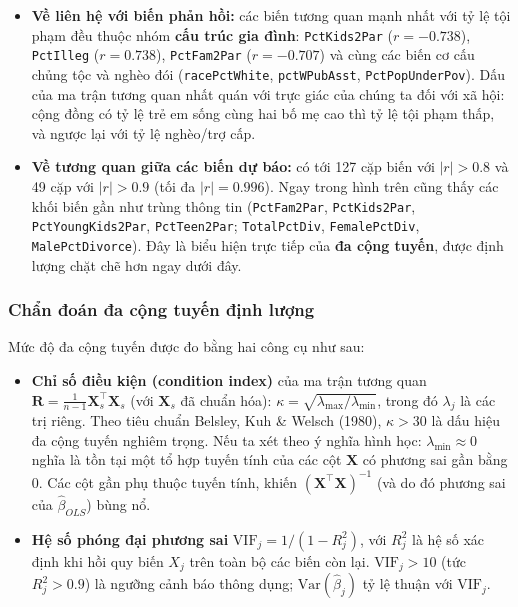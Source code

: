 \begin{itemize}
\tightlist
\item
  \textbf{Về liên hệ với biến phản hồi:} các biến tương quan mạnh nhất
  với tỷ lệ tội phạm đều thuộc nhóm \textbf{cấu trúc gia đình}:
  \texttt{PctKids2Par} (\(r = -0.738\)), \texttt{PctIlleg}
  (\(r = 0.738\)), \texttt{PctFam2Par} (\(r = -0.707\)) và cùng các biến
  cơ cấu chủng tộc và nghèo đói (\texttt{racePctWhite},
  \texttt{pctWPubAsst}, \texttt{PctPopUnderPov}). Dấu của ma trận tương
  quan nhất quán với trực giác của chúng ta đối với xã hội: cộng đồng có
  tỷ lệ trẻ em sống cùng hai bố mẹ cao thì tỷ lệ tội phạm thấp, và ngược
  lại với tỷ lệ nghèo/trợ cấp.
\item
  \textbf{Về tương quan giữa các biến dự báo:} có tới 127 cặp biến với
  \(|r| > 0.8\) và 49 cặp với \(|r| > 0.9\) (tối đa \(|r| = 0.996\)).
  Ngay trong hình trên cũng thấy các khối biến gần như trùng thông tin
  (\texttt{PctFam2Par}, \texttt{PctKids2Par}, \texttt{PctYoungKids2Par},
  \texttt{PctTeen2Par}; \texttt{TotalPctDiv}, \texttt{FemalePctDiv},
  \texttt{MalePctDivorce}).
  Đây là biểu hiện trực tiếp của \textbf{đa cộng tuyến}, được định lượng
  chặt chẽ hơn ngay dưới đây.
\end{itemize}

\subsubsection{Chẩn đoán đa cộng tuyến định
lượng}\label{chux1ea9n-ux111ouxe1n-ux111a-cux1ed9ng-tuyux1ebfn-ux111ux1ecbnh-lux1b0ux1ee3ng}

Mức độ đa cộng tuyến được đo bằng hai công cụ như sau:

\begin{itemize}
\tightlist
\item
  \textbf{Chỉ số điều kiện (condition index)} của ma trận tương quan
  \(\mathbf{R} = \frac{1}{n-1}\mathbf{X}_s^\top \mathbf{X}_s\) (với
  \(\mathbf{X}_s\) đã chuẩn hóa):
  \(\kappa = \sqrt{\lambda_{\max} / \lambda_{\min}}\), trong đó
  \(\lambda_j\) là các trị riêng. Theo tiêu chuẩn Belsley, Kuh \& Welsch
  (1980), \(\kappa > 30\) là dấu hiệu đa cộng tuyến nghiêm trọng. Nếu ta
  xét theo ý nghĩa hình học: \(\lambda_{\min} \approx 0\) nghĩa là tồn
  tại một tổ hợp tuyến tính của các cột \(\mathbf{X}\) có phương sai gần
  bằng 0. Các cột gần phụ thuộc tuyến tính, khiến
  \((\mathbf{X}^\top\mathbf{X})^{-1}\) (và do đó phương sai của
  \(\hat{\beta}_{OLS}\)) bùng nổ.
\item
  \textbf{Hệ số phóng đại phương sai}
  \(\mathrm{VIF}_j = 1/(1 - R_j^2)\), với \(R_j^2\) là hệ số xác định
  khi hồi quy biến \(X_j\) trên toàn bộ các biến còn lại.
  \(\mathrm{VIF}_j > 10\) (tức \(R_j^2 > 0.9\)) là ngưỡng cảnh báo thông
  dụng; \(\mathrm{Var}(\hat\beta_j)\) tỷ lệ thuận với
  \(\mathrm{VIF}_j\).
\end{itemize}


